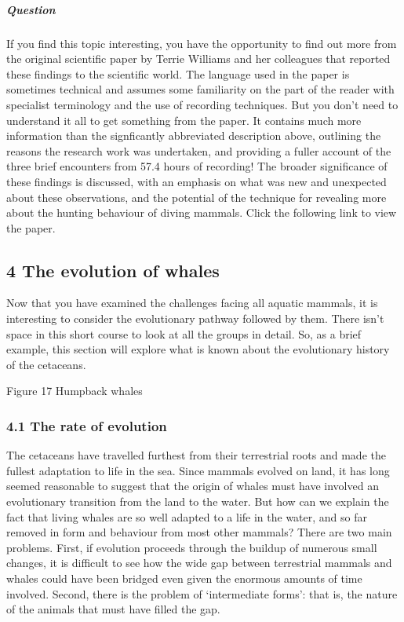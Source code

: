 \documentclass[letterpaper,10pt,english]{sphinxmanual}
\let\sphinxpxdimen\pdfpxdimen\else\newdimen\sphinxpxdimen
\begin{document}
\subparagraph{Question}
\label{\detokenize{content/session_00/Part_00_03:id5}}
If you find this topic interesting, you have the opportunity to find out more from the original scientific paper by Terrie Williams and her colleagues that reported these findings to the scientific world. The language used in the paper is sometimes technical and assumes some familiarity on the part of the reader with specialist terminology and the use of recording techniques. But you don’t need to understand it all to get something from the paper. It contains much more information than the
signficantly abbreviated description above, outlining the reasons the research work was undertaken, and providing a fuller account of the three brief encounters \textendash{} from 57.4 hours of recording! The broader significance of these findings is discussed, with an emphasis on what was new and unexpected about these observations, and the potential of the technique for revealing more about the hunting behaviour of diving mammals. Click the following link to view the paper. 


\subsection{4 The evolution of whales}
\label{\detokenize{content/session_00/Part_00_04:4-The-evolution-of-whales}}\label{\detokenize{content/session_00/Part_00_04::doc}}
Now that you have examined the challenges facing all aquatic mammals, it is interesting to consider the evolutionary pathway followed by them. There isn’t space in this short course to look at all the groups in detail. So, as a brief example, this section will explore what is known about the evolutionary history of the cetaceans.

\sphinxincludegraphics[width=512\sphinxpxdimen,height=191\sphinxpxdimen]{{s182_11_figure_15_composite}.jpg}

Figure 17 Humpback whales


\subsubsection{4.1 The rate of evolution}
\label{\detokenize{content/session_00/Part_00_04:4.1-The-rate-of-evolution}}
The cetaceans have travelled furthest from their terrestrial roots and made the fullest adaptation to life in the sea. Since mammals evolved on land, it has long seemed reasonable to suggest that the origin of whales must have involved an evolutionary transition from the land to the water. But how can we explain the fact that living whales are so well adapted to a life in the water, and so far removed in form and behaviour from most other mammals? There are two main problems. First, if evolution
proceeds through the build\sphinxhyphen{}up of numerous small changes, it is difficult to see how the wide gap between terrestrial mammals and whales could have been bridged \textendash{} even given the enormous amounts of time involved. Second, there is the problem of ‘intermediate forms’: that is, the nature of the animals that must have filled the gap.
\end{document}

